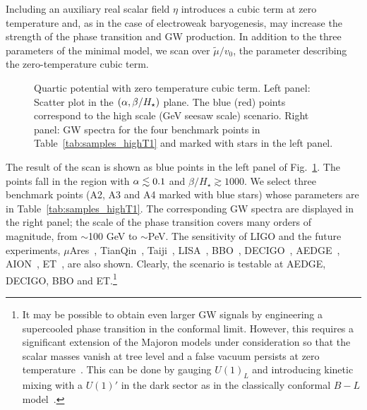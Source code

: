 \documentclass[a4paper,11pt]{article}
\begin{document}
Including an auxiliary real scalar field $\eta$ introduces a cubic term at zero temperature
and, as in the case of electroweak baryogenesis, may increase the strength of the phase transition 
and GW production. In addition to the three parameters of the minimal model, we
scan over $\widetilde{\mu}/v_0$, the parameter describing the zero-temperature cubic term. 
\begin{figure}
\begin{center}
\hspace{2mm}
\end{center}
\caption{Quartic potential with zero temperature cubic term. Left panel: Scatter plot in the $(\alpha, \beta/H_\star)$ plane. The blue (red) points
correspond to the high scale (GeV seesaw scale) scenario. Right panel: GW spectra for the four benchmark points in Table~\ref{tab:samples_highT1} and marked with stars in the left panel.}
\label{f2}
\end{figure}
The result of the scan is shown as blue points in the left panel of Fig.~\ref{f2}.
 The points fall in the region with $\alpha \lesssim 0.1$ and $\beta/H_\star \gtrsim 1000$.
We select three benchmark points (A2, A3 and A4 marked with blue stars) whose parameters are in Table~\ref{tab:samples_highT1}. 
The corresponding GW spectra are displayed in the right panel; the scale of the phase transition covers many orders of magnitude, from 
$\sim$100 GeV to $\sim$PeV. The sensitivity of 
LIGO \cite{Aasi:2013wya,Abbott:2021xxi} and the future experiments, 
$\mu$Ares~\cite{Sesana:2019vho}, 
TianQin~\cite{Luo:2015ght}, 
Taiji~\cite{Guo:2018npi}, 
LISA~\cite{Auclair:2019wcv}, 
BBO~\cite{Yagi:2011wg}, 
DECIGO~\cite{Kawamura:2019jqt}, 
AEDGE~\cite{Bertoldi:2019tck}, 
AION~\cite{Badurina:2019hst}, 
ET~\cite{Hild:2010id},
are also shown. 
Clearly, the scenario is testable at 
AEDGE, DECIGO, BBO and  ET.\footnote{It may be possible to obtain even larger
 GW signals by engineering a supercooled phase transition in the conformal limit. However, this requires a significant extension of the Majoron models under consideration so that the scalar masses vanish at tree level and a false vacuum persists at zero temperature~\cite{Espinosa:2007qk}. 
This can be done by gauging $U(1)_L$ and introducing kinetic 
mixing with a $U(1)'$ in the dark sector as in the classically conformal $B-L$ model~\cite{Das:2016zue,Iso:2017uuu,Marzo:2018nov}.}
\end{document}
